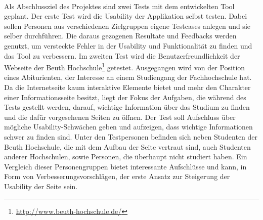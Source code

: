 \\
Als Abschlussziel des Projektes sind zwei Tests mit dem entwickelten Tool geplant. Der erste Test wird die Usability der Applikation selbst testen. Dabei sollen Personen aus verschiedenen Zielgruppen eigene Testcases anlegen und sie selber durchführen. Die daraus gezogenen Resultate und Feedbacks werden genutzt, um versteckte Fehler in der Usability und Funktionalität zu finden und das Tool zu verbessern. Im zweiten Test wird die Benutzerfreundlichkeit der Webseite der Beuth Hochschule\footnote{\url{http://www.beuth-hochschule.de/}} getestet. Ausgegangen wird von der Position eines Abiturienten, der Interesse an einem Studiengang der Fachhochschule hat. Da die Internetseite kaum interaktive Elemente bietet und mehr den Charakter einer Informationsseite besitzt, liegt der Fokus der Aufgaben, die während des Tests gestellt werden, darauf, wichtige Information über das Studium zu finden und die dafür vorgesehenen Seiten zu öffnen. Der Test soll Aufschluss über mögliche Usability-Schwächen geben und aufzeigen, dass wichtige Informationen schwer zu finden sind. Unter den Testpersonen befinden sich neben Studenten der Beuth Hochschule, die mit dem Aufbau der Seite vertraut sind, auch Studenten anderer Hochschulen, sowie Personen, die überhaupt nicht studiert haben. Ein Vergleich dieser Personengruppen bietet interessante Aufschlüsse und kann, in Form von Verbesserungsvorschlägen, der erste Ansatz zur Steigerung der Usability der Seite sein.